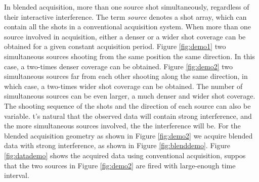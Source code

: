 In blended acquisition, more than one source  shot simultaneously, regardless of their interactive interference. The term \emph{source} denotes a shot array, which can contain all the shots in a conventional acquisition system. When more than one source  involved in acquisition, either a denser or a wider shot coverage can be obtained for a given constant acquisition period. Figure \ref{fig:demo1}  two simultaneous sources shooting from the same position  the same direction. In this case, a two-times denser coverage can be obtained. Figure \ref{fig:demo2}  two simultaneous sources far from each other shooting along the same direction, in which case, a two-times wider shot coverage can be obtained. The number of simultaneous sources can be even larger,  a much denser and wider shot coverage. The shooting sequence of the shots and the direction of each source can also be variable. t's natural\new{,} that the observed data will contain strong interference, and the more simultaneous sources involved, the  the interference will be. For the blended acquisition geometry as shown in Figure \ref{fig:demo2}\old{,} we  acquire  blended data\old{,} with strong interference, as shown in Figure \ref{fig:blenddemo}. Figure \ref{fig:datademo} shows the acquired data using conventional acquisition, suppos that the two sources in Figure \ref{fig:demo2} are fired with large-enough time interval.


